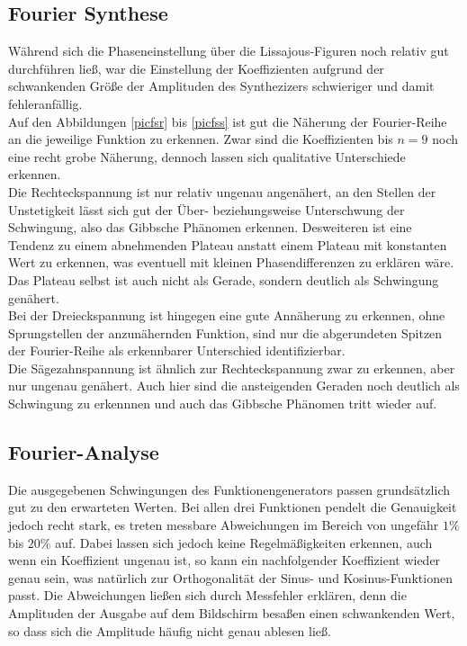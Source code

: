%
%
\subsection{Fourier Synthese}
Während sich die Phaseneinstellung über die Lissajous-Figuren noch relativ
gut durchführen ließ, war die Einstellung der Koeffizienten aufgrund der schwankenden
Größe der Amplituden des Synthezizers schwieriger und damit fehleranfällig.\\
Auf den Abbildungen \ref{picfsr} bis \ref{picfss} ist gut die Näherung der Fourier-Reihe 
an die jeweilige Funktion zu erkennen. Zwar sind die Koeffizienten bis $n=9$ noch eine recht
grobe Näherung, dennoch lassen sich qualitative Unterschiede erkennen.\\ Die Rechteckspannung ist
nur relativ ungenau angenähert, an den Stellen der Unstetigkeit lässt sich gut der Über- beziehungsweise
Unterschwung der Schwingung, also das Gibbsche Phänomen erkennen. Desweiteren ist eine Tendenz 
zu einem abnehmenden Plateau anstatt einem Plateau mit konstanten Wert zu erkennen, was
eventuell mit kleinen Phasendifferenzen zu erklären wäre. Das Plateau selbst ist
auch nicht als Gerade, sondern deutlich als Schwingung genähert.\\
Bei der Dreieckspannung ist hingegen eine gute Annäherung zu erkennen, ohne Sprungstellen
der anzunähernden Funktion, sind nur die abgerundeten Spitzen der Fourier-Reihe als erkennbarer
Unterschied identifizierbar.\\
Die Sägezahnspannung ist ähnlich zur Rechteckspannung zwar zu erkennen, aber nur ungenau
genähert. Auch hier sind die ansteigenden Geraden noch deutlich als Schwingung zu erkennnen und
auch das Gibbsche Phänomen tritt wieder auf.
\subsection{Fourier-Analyse}
Die ausgegebenen Schwingungen des Funktionengenerators passen grundsätzlich
gut zu den erwarteten Werten. Bei allen drei Funktionen pendelt die Genauigkeit
jedoch recht stark, es treten messbare Abweichungen im Bereich von ungefähr
$1\%$ bis $20\%$ auf. Dabei lassen sich jedoch keine Regelmäßigkeiten erkennen,
auch wenn ein Koeffizient ungenau ist, so kann ein nachfolgender Koeffizient wieder
genau sein, was natürlich zur Orthogonalität der Sinus- und Kosinus-Funktionen passt.
Die Abweichungen ließen sich durch Messfehler erklären, denn die Amplituden der Ausgabe
auf dem Bildschirm besaßen einen schwankenden Wert, so dass sich die Amplitude häufig nicht
genau ablesen ließ. 